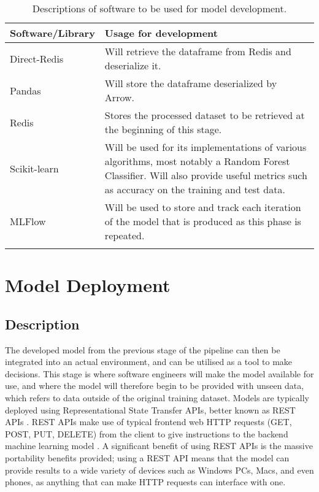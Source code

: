 \begin{longtable}{ |p{}| p{}|}
    \hline
    \cellcolor{blue!25}Software/Library & \cellcolor{blue!25}Usage for development\\
    \hline
    Direct-Redis &
    Will retrieve the dataframe from Redis and deserialize it.\\
    \hline
    Pandas & 
    Will store the dataframe deserialized by Arrow.\\
    \hline
    Redis &
    Stores the processed dataset to be retrieved at the beginning of this stage.\\
    \hline
    Scikit-learn & 
    Will be used for its implementations of various algorithms, most notably a Random Forest Classifier.
    Will also provide useful metrics such as accuracy on the training and test data.\\
    \hline
    MLFlow &
    Will be used to store and track each iteration of the model that is produced as this phase is 
    repeated.\\
    \hline
\caption{Descriptions of software to be used for model development.}\label{tab:DevelopmentSoftware}
\end{longtable}



\section{Model Deployment}\label{sec:Deployment}
\subsection{Description}
The developed model from the previous stage of the pipeline can then be integrated into an actual environment,
and can be utilised as a tool to make decisions. This stage is where software engineers will make the model 
available for use, and where the model will therefore begin to be provided with unseen data, which refers to data 
outside of the original training dataset. Models are typically deployed using Representational State Transfer APIs, 
better known as REST APIs \autocite{redhat_what_nodate}. REST APIs make use of typical frontend web 
HTTP requests (GET, POST, PUT, DELETE) from the client to give instructions to the backend machine learning
model \autocite{restfulapi_what_2023}. A significant benefit of using REST APIs is the 
massive portability benefits provided; using a REST API means that the model can provide results to a 
wide variety of devices such as Windows PCs, Macs, and even phones, as anything that can make HTTP requests 
can interface with one.


